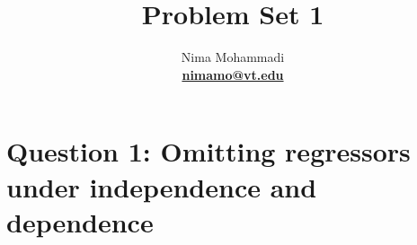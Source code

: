 \documentclass[11pt,reqno]{article}   %
\begin{document}


\title{Problem Set 1}
\author{Nima Mohammadi \\ \href{mailto:nimamo@vt.edu}{\textbf{nimamo@vt.edu}}} %

\maketitle %


\section*{Question 1: Omitting regressors under independence and dependence}
\end{document}
